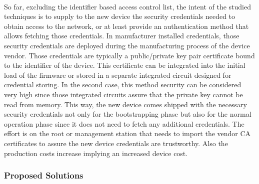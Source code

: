 \paragraph{}
So far, excluding the identifier based access control list, the intent of the studied techniques is to supply to the new device the security credentials needed to obtain access to the network, or at least provide an authentication method that allows fetching those credentials. In manufacturer installed credentials, those security credentials are deployed during the manufacturing process of the device vendor. Those credentials are typically a public/private key pair certificate bound to the identifier of the device. This certificate can be integrated into the initial load of the firmware or stored in a separate integrated circuit designed for credential storing. In the second case, this method security can be considered very high since those integrated circuits assure that the private key cannot be read from memory. This way, the new device comes shipped with the necessary security credentials not only for the bootstrapping phase but also for the normal operation phase since it does not need to fetch any additional credentials. The effort is on the root or management station that needs to import the vendor CA certificates to assure the new device credentials are trustworthy. Also the production costs increase implying an increased device cost.

\subsubsection{Proposed Solutions}
